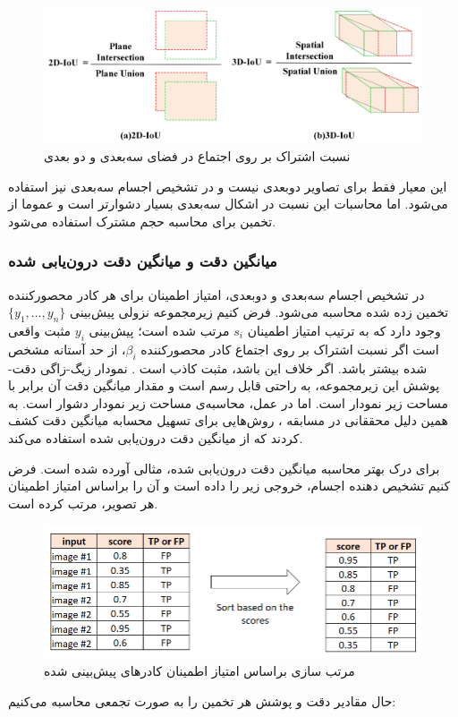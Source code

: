 \begin{figure}[h!]
    \centering
    \includegraphics[width=0.8\linewidth]{figures/3d_IoU.png}
    \caption{نسبت اشتراک بر روی اجتماع در فضای سه‌بعدی و  دو بعدی \cite{han2022hybrid}}
    \label{fig:3d_IoU}
\end{figure}

این معیار فقط برای تصاویر دوبعدی نیست و در تشخیص اجسام سه‌بعدی نیز استفاده می‌شود. اما محاسبات این نسبت در اشکال سه‌بعدی بسیار دشوارتر است و عموما از تخمین برای محاسبه حجم مشترک استفاده می‌شود.


\subsubsection{میانگین دقت و میانگین دقت درون‌یابی شده}

در تشخیص اجسام سه‌بعدی و دوبعدی، امتیاز اطمینان برای هر کادر محصورکننده تخمین زده شده محاسبه می‌شود. فرض کنیم زیرمجموعه نزولی پیش‌بینی‌‌ $\{y_1, \ldots, y_n\}$ وجود دارد که به ترتیب امتیاز اطمینان $s_i$ مرتب شده است؛ پیش‌بینی $y_i$ مثبت واقعی است اگر نسبت اشتراک بر روی اجتماع کادر محصورکننده $\beta_i$، از حد آستانه مشخص شده بیشتر باشد. اگر خلاف این باشد، مثبت کاذب است \cite{qian20223d}. نمودار زیگ-زاگی دقت-پوشش این زیرمجموعه، به راحتی قابل رسم است و مقدار میانگین دقت آن برابر با مساحت زیر نمودار است. اما در عمل، محاسبه‌ی مساحت زیر نمودار دشوار است. به همین دلیل محققانی در مسابقه ، روش‌هایی برای تسهیل محسابه میانگین دقت کشف کردند که از میانگین دقت درون‌یابی شده استفاده می‌کند.

برای درک بهتر محاسبه میانگین دقت درون‌یابی شده، مثالی آورده شده است. فرض کنیم تشخیص‌‌ دهنده اجسام، خروجی زیر را داده است و آن را براساس امتیاز اطمینان هر تصویر، مرتب کرده‌ است.

\begin{figure}[h!]
    \centering
    \includegraphics[width=1\linewidth]{figures/bbox_sorting.png}
    \caption{مرتب‌ سازی براساس امتیاز اطمینان کادرهای پیش‌بینی شده}
    \label{fig:bbox_sorting}
\end{figure}
حال مقادیر دقت و پوشش هر تخمین را به صورت تجمعی محاسبه می‌کنیم:

